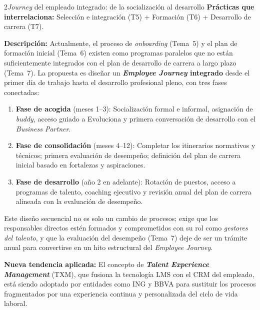 \begin{recomendacion}{2}{\textit{Journey} del empleado integrado: de la socialización al desarrollo}
\textbf{Prácticas que interrelaciona:} Selección e integración (T5) + Formación (T6) + Desarrollo de carrera (T7).

\medskip
\textbf{Descripción:}
Actualmente, el proceso de \textit{onboarding} (Tema~5) y el plan de formación
inicial (Tema~6) existen como programas paralelos que no están suficientemente
integrados con el plan de desarrollo de carrera a largo plazo (Tema~7).
La propuesta es diseñar un \textbf{\textit{Employee Journey} integrado} desde
el primer día de trabajo hasta el desarrollo profesional pleno, con tres fases
conectadas:
\begin{enumerate}
  \item \textbf{Fase de acogida} (meses 1--3): Socialización formal e informal,
        asignación de \textit{buddy}, acceso guiado a Evoluciona y primera
        conversación de desarrollo con el \textit{Business Partner}.
  \item \textbf{Fase de consolidación} (meses 4--12): Completar los itinerarios
        normativos y técnicos; primera evaluación de desempeño; definición del
        plan de carrera inicial basado en fortalezas y aspiraciones.
  \item \textbf{Fase de desarrollo} (año 2 en adelante): Rotación de puestos,
        acceso a programas de talento, coaching ejecutivo y revisión anual del
        plan de carrera alineada con la evaluación de desempeño.
\end{enumerate}
Este diseño secuencial no es solo un cambio de procesos; exige que los
responsables directos estén formados y comprometidos con su rol como
\textit{gestores del talento}, y que la evaluación del desempeño (Tema~7) deje
de ser un trámite anual para convertirse en un hito estructural del
\textit{Employee Journey}.

\medskip
\textbf{Nueva tendencia aplicada:}
El concepto de \textbf{\textit{Talent Experience Management}} (TXM), que fusiona
la tecnología LMS con el CRM del empleado, está siendo adoptado por entidades
como ING y BBVA para sustituir los procesos fragmentados por una experiencia
continua y personalizada del ciclo de vida laboral.
\end{recomendacion}

